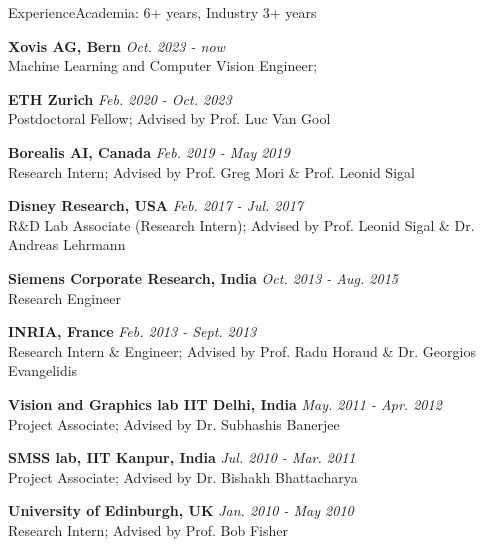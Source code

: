 \documentclass{resume_long} %
\begin{document}

\begin{rSection}{Experience}{\quad Academia: 6+ years, Industry 3+ years}

    {\bf \footnotesize{Xovis AG, Bern}} \hfill {\em \footnotesize{Oct. 2023 - now}} 
    \\ \footnotesize{Machine Learning and Computer Vision Engineer};
      
    {\bf \footnotesize{ETH Zurich}} \hfill {\em \footnotesize{Feb. 2020 - Oct. 2023}} 
    \\ \footnotesize{Postdoctoral Fellow}; \footnotesize{Advised by Prof. Luc Van Gool}
        
    {\bf \footnotesize{Borealis AI, Canada}} \hfill {\em \footnotesize{Feb. 2019 - May 2019}} 
    \\ \footnotesize{Research Intern}; \footnotesize{Advised by Prof. Greg Mori \& Prof. Leonid Sigal}
    
    {\bf \footnotesize{Disney Research, USA}} \hfill {\em \footnotesize{Feb. 2017 - Jul. 2017}} 
    \\ \footnotesize{R\&D Lab Associate (Research Intern)}; \footnotesize{Advised by Prof. Leonid Sigal \& Dr. Andreas Lehrmann}
    
    {\bf \footnotesize{Siemens Corporate Research, India}} \hfill {\em \footnotesize{Oct. 2013 - Aug. 2015}} 
    \\ \footnotesize{Research Engineer}
    
    {\bf INRIA, France} \hfill {\em Feb. 2013 - Sept. 2013} 
    \\ \footnotesize{Research Intern \& Engineer}; \footnotesize{Advised by Prof. Radu Horaud \& Dr. Georgios Evangelidis}
    
    {\bf \footnotesize{Vision and Graphics lab IIT Delhi, India}} \hfill {\em \footnotesize{May. 2011 - Apr. 2012}} 
    \\ \footnotesize{Project Associate}; \footnotesize{Advised by Dr. Subhashis Banerjee}
    
    {\bf \footnotesize{SMSS lab, IIT Kanpur, India}} \hfill {\em \footnotesize{Jul. 2010 - Mar. 2011}} 
    \\ \footnotesize{Project Associate}; \footnotesize{Advised by Dr. Bishakh Bhattacharya}

    {\bf \footnotesize{University of Edinburgh, UK}} \hfill {\em \footnotesize{Jan. 2010 - May 2010}} 
    \\ \footnotesize{Research Intern}; \footnotesize{Advised by Prof. Bob Fisher}
\end{rSection}
\end{document}

